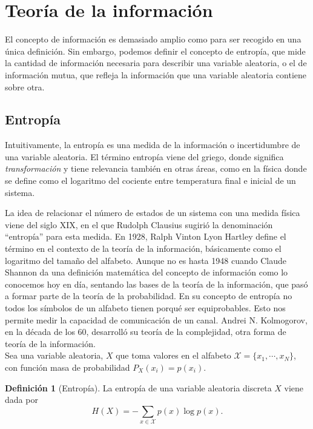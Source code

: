 \documentclass[10pt,a4paper]{article} %
\theoremstyle{definition}
\newtheorem{definition}{Definición}[section]
\begin{document}
     
    \section{Teoría de la información}

    El concepto de información es demasiado amplio como para ser recogido en una única definición. Sin embargo, podemos definir el concepto de entropía, que mide la cantidad de información necesaria para describir una variable aleatoria, o el de información mutua, que refleja la información que una variable aleatoria contiene sobre otra.

    \subsection{Entropía}

    Intuitivamente, la entropía es una medida de la información o incertidumbre de una variable aleatoria. El término entropía viene del griego, donde significa \textit{transformación} y tiene relevancia también en otras áreas, como en la física donde se define como el logaritmo del cociente entre temperatura final e inicial de un sistema.

    La idea de relacionar el número de estados de un sistema con una medida física viene del siglo XIX, en el que Rudolph Clausius sugirió la denominación ``entropía'' para esta medida. En 1928, Ralph Vinton Lyon Hartley define el término en el contexto de la teoría de la información, básicamente como el logaritmo del tamaño del alfabeto. Aunque no es hasta 1948 cuando Claude Shannon da una definición matemática del concepto de información como lo conocemos hoy en día,  sentando las bases de la teoría de la información, que pasó a formar parte de la teoría de la probabilidad. En su concepto de entropía no todos los símbolos de un alfabeto tienen porqué ser equiprobables. Esto nos permite medir la capacidad de comunicación de un canal. Andrei N. Kolmogorov, en la década de los 60, desarrolló su teoría de la complejidad, otra forma de teoría de la información.\\

Sea una variable aleatoria, $X$ que toma valores en el alfabeto $\mathcal{X} = \{x_1, \cdots, x_N \}$, con función masa de probabilidad $P_X(x_i) = p(x_i)$.

\begin{definition}[Entropía]
  La entropía de una variable aleatoria discreta $X$ viene dada por \[H(X) = - \sum_{x\in \mathcal{X}} p(x) \log p(x).\]
\end{definition}
\end{document}
